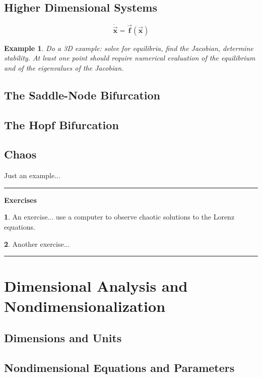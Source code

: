 \documentclass[reqno]{immbook}
\newcommand{\BF}{\vec{\textbf{f}}}
\newcommand{\BX}{\vec{\textbf{x}}}
\numberwithin{equation}{chapter}
\numberwithin{question}{section}
\numberwithin{theorem}{chapter}
\numberwithin{figure}{chapter}
\theoremstyle{definition}
\newtheorem{exercise}{}[section]
\newtheorem{example}{Example}[section]
\newenvironment{exercises}%
{%
\medskip\hrule\medskip\noindent\textbf{Exercises}%
}%
{%
\medskip\hrule
}
\begin{document}
\newpage

\section{Higher Dimensional Systems}
\[
  \dot{\BX} = \BF(\BX)
\]
\begin{example}
\emph{Do a 3D example: solve for equilibria, find the
Jacobian, determine stability.  At least one point
should require numerical evaluation of the equilibrium
and of the eigenvalues of the Jacobian.}
\end{example}
%

\section{The Saddle-Node Bifurcation}

\section{The Hopf Bifurcation}

\section{Chaos}
Just an example...

\begin{exercises}
\begin{exercise}
An exercise... use a computer to observe chaotic solutions
to the Lorenz equations.
\end{exercise}
\begin{exercise}
Another exercise...
\end{exercise}
\end{exercises}
%
%
%

\chapter[Dimensional Analysis]{Dimensional Analysis and Nondimensionalization}
\section{Dimensions and Units}
\section{Nondimensional Equations and Parameters}
\end{document}

